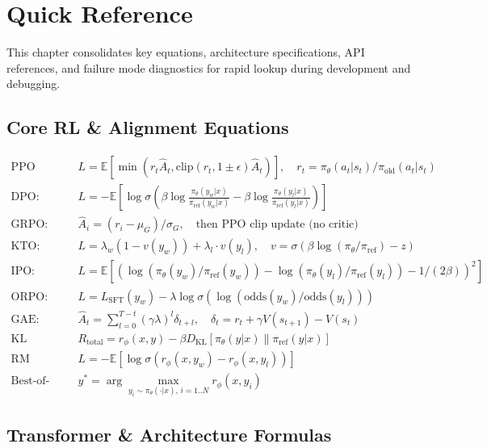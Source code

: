 \chapter{Quick Reference}
\label{quick-reference}

This chapter consolidates key equations, architecture specifications, API references, and failure mode diagnostics for rapid lookup during development and debugging.

\section{Core RL \& Alignment Equations}
\label{core-rl-alignment-equations}

\begin{align}
\text{PPO Clip:}&\quad L = \mathbb{E}[\min(r_t\hat{A}_t, \text{clip}(r_t,1{\pm}\epsilon)\hat{A}_t)], \quad r_t = \pi_\theta(a_t|s_t)/\pi_{\text{old}}(a_t|s_t) \\
\text{DPO:}&\quad L = -\mathbb{E}[\log\sigma(\beta\log\tfrac{\pi_\theta(y_w|x)}{\pi_\text{ref}(y_w|x)} - \beta\log\tfrac{\pi_\theta(y_l|x)}{\pi_\text{ref}(y_l|x)})] \\
\text{GRPO:}&\quad \hat{A}_i = (r_i - \mu_G)/\sigma_G, \quad \text{then PPO clip update (no critic)} \\
\text{KTO:}&\quad L = \lambda_w(1 - v(y_w)) + \lambda_l \cdot v(y_l), \quad v = \sigma(\beta\log(\pi_\theta/\pi_\text{ref}) - z) \\
\text{IPO:}&\quad L = \mathbb{E}[(\log(\pi_\theta(y_w)/\pi_\text{ref}(y_w)) - \log(\pi_\theta(y_l)/\pi_\text{ref}(y_l)) - 1/(2\beta))^2] \\
\text{ORPO:}&\quad L = L_\text{SFT}(y_w) - \lambda\log\sigma(\log(\text{odds}(y_w)/\text{odds}(y_l))) \\
\text{GAE:}&\quad \hat{A}_t = \textstyle\sum_{l=0}^{T-t}(\gamma\lambda)^l\delta_{t+l}, \quad \delta_t = r_t + \gamma V(s_{t+1}) - V(s_t) \\
\text{KL Penalty:}&\quad R_\text{total} = r_\phi(x,y) - \beta D_\text{KL}[\pi_\theta(y|x)\|\pi_\text{ref}(y|x)] \\
\text{RM (Bradley-Terry):}&\quad L = -\mathbb{E}[\log\sigma(r_\phi(x,y_w)-r_\phi(x,y_l))] \\
\text{Best-of-N:}&\quad y^* = \arg\max_{y_i \sim \pi_\theta(\cdot|x),\, i=1..N} r_\phi(x, y_i)
\end{align}

\section{Transformer \& Architecture Formulas}
\label{transformer-architecture-formulas}

